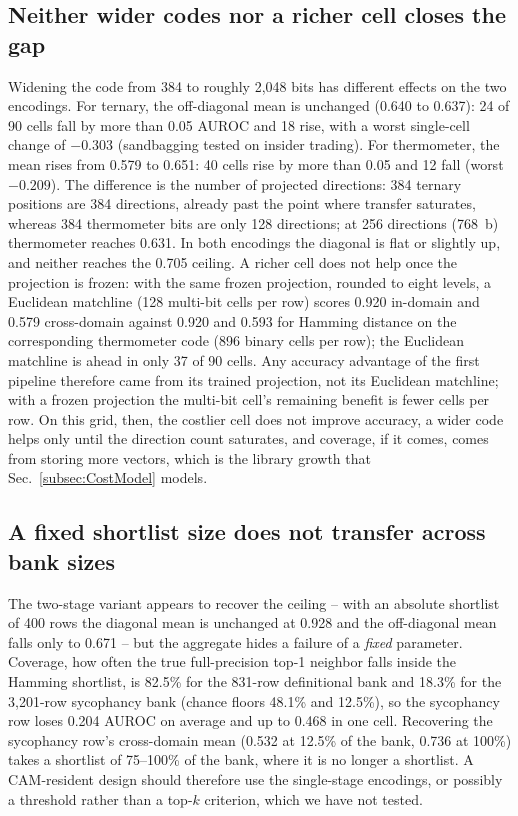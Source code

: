 \documentclass[conference]{IEEEtran}
\newcommand{\cam}{{CAM}\xspace}
\newcommand{\auroc}{{AUROC}\xspace}
\begin{document}
\subsection{Neither wider codes nor a richer cell closes the gap}
\label{subsec:BitWidth}
Widening the code from 384 to roughly 2{,}048 bits has different
effects on the two encodings. For ternary, the off-diagonal mean is
unchanged (0.640 to 0.637): 24 of 90 cells fall by more than 0.05
\auroc and 18 rise, with a worst single-cell change of $-0.303$
(sandbagging tested on insider trading). For thermometer, the mean
rises from 0.579 to 0.651: 40 cells rise by more than 0.05 and 12
fall (worst $-0.209$). The difference is the number of projected
directions: 384 ternary positions are 384 directions, already past
the point where transfer saturates, whereas 384 thermometer bits are
only 128 directions; at 256 directions (768~b) thermometer reaches
0.631. In both encodings the diagonal is flat or slightly up, and
neither reaches the 0.705 ceiling. A
richer cell does not help once the projection is frozen: with
the same frozen projection, rounded to eight levels, a Euclidean
matchline (128 multi-bit cells per row)
scores 0.920 in-domain and 0.579 cross-domain against 0.920 and 0.593
for Hamming distance on the corresponding thermometer code (896
binary cells per row); the Euclidean matchline is ahead in only 37
of 90 cells. Any accuracy
advantage of the first pipeline therefore came from its trained
projection, not its Euclidean matchline; with a frozen projection the multi-bit cell's
remaining benefit is fewer cells per row. On this grid, then, the
costlier cell does not improve accuracy, a wider code helps only
until the direction count saturates, and coverage, if it comes, comes
from storing more vectors, which is the library growth that Sec.~\ref{subsec:CostModel} models.

\subsection{A fixed shortlist size does not transfer across bank sizes}
\label{subsec:Shortlist}
The two-stage variant appears to recover the ceiling -- with an
absolute shortlist of 400 rows the diagonal mean is unchanged at
0.928 and the off-diagonal mean falls only to 0.671 -- but the
aggregate hides a failure of a \emph{fixed} parameter. Coverage, how
often the true full-precision top-1 neighbor falls inside the
Hamming shortlist, is 82.5\% for the 831-row definitional bank and
18.3\% for the 3{,}201-row sycophancy bank (chance floors 48.1\% and
12.5\%), so the sycophancy row loses 0.204 \auroc on average and up
to 0.468 in one cell. Recovering the sycophancy row's cross-domain
mean (0.532 at 12.5\% of the bank, 0.736 at 100\%) takes a shortlist
of 75--100\% of the bank, where it is no longer a shortlist. A
\cam-resident design should therefore use the single-stage
encodings, or possibly a threshold rather than a top-$k$ criterion,
which we have not tested.
\end{document}
